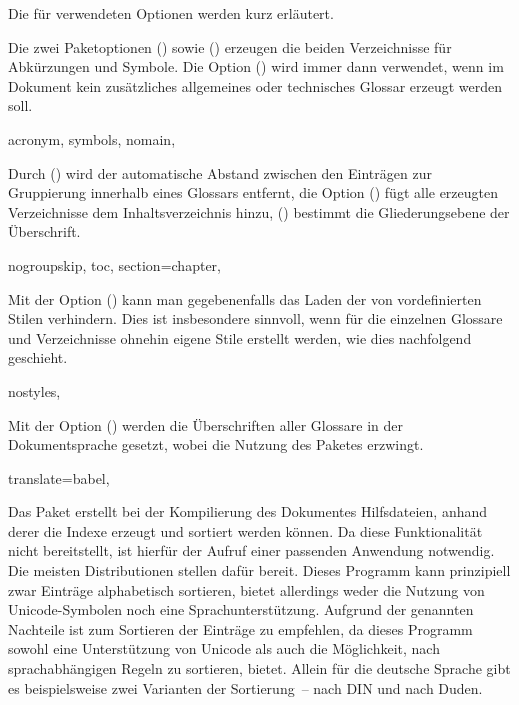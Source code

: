 \documentclass[%
  english,ngerman,%
  cdgeometry=no,DIV=12,automark%
]{tudscrartcl}
\begin{document}
Die für  verwendeten Optionen werden kurz erläutert.
%
\begin{Preamble+}
\AfterPackage*{hyperref}{%
\end{Preamble+}
\begin{Preamble}
\usepackage[%
\end{Preamble}
%
Die zwei Paketoptionen () sowie 
() erzeugen die beiden Verzeichnisse für 
Abkürzungen und Symbole. Die Option () wird 
immer dann verwendet, wenn im Dokument kein zusätzliches allgemeines oder 
technisches Glossar erzeugt werden soll.
%
\begin{Preamble}
  acronym,%
  symbols,%
  nomain,%
\end{Preamble}
%
Durch () wird der automatische Abstand 
zwischen den Einträgen zur Gruppierung innerhalb eines Glossars entfernt, die 
Option () fügt alle erzeugten Verzeichnisse 
dem Inhaltsverzeichnis hinzu, () bestimmt 
die Gliederungsebene der Überschrift.
%
\begin{Preamble}
  nogroupskip,%
  toc,%
  section=chapter,%
\end{Preamble}
%
Mit der Option () kann man gegebenenfalls 
das Laden der von  vordefinierten Stilen verhindern. Dies 
ist insbesondere sinnvoll, wenn für die einzelnen Glossare und Verzeichnisse 
ohnehin eigene Stile erstellt werden, wie dies nachfolgend geschieht.
%
\begin{Preamble}
  nostyles,%
\end{Preamble}
%
Mit der Option () werden die Überschriften
aller Glossare in der Dokumentsprache gesetzt, wobei  
die Nutzung des Paketes  erzwingt. 
%
\begin{Preamble}
  translate=babel,%
\end{Preamble}
%
Das Paket  erstellt bei der Kompilierung des Dokumentes 
Hilfsdateien, anhand derer die Indexe erzeugt und sortiert werden können. Da 
 diese Funktionalität nicht bereitstellt, ist hierfür der 
Aufruf einer passenden Anwendung notwendig. Die meisten Distributionen stellen
dafür  bereit. Dieses Programm kann prinzipiell zwar 
Einträge alphabetisch sortieren, bietet allerdings weder die Nutzung von 
Unicode-Symbolen noch eine Sprachunterstützung. Aufgrund der genannten 
Nachteile ist  zum Sortieren der Einträge zu empfehlen, da 
dieses Programm sowohl eine Unterstützung von Unicode als auch die Möglichkeit, 
nach sprachabhängigen Regeln zu sortieren, bietet. Allein für die deutsche 
Sprache gibt es beispielsweise zwei Varianten der Sortierung~-- nach DIN und 
nach Duden. 
\end{document}

